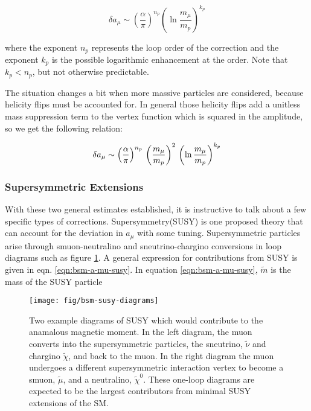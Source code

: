 \begin{equation}
\label{eqn:bsm-general-small-m}
\delta a_\mu \sim \left(\frac{\alpha}{\pi}\right)^{n_p} \left( \ln{\frac{m_\mu}{m_p}} \right)^{k_p}
\end{equation}

\noindent
where the exponent $n_p$ represents the loop order of the correction and the exponent $k_p$ is the possible logarithmic enhancement at the order.  Note that $k_p < n_p$, but not otherwise predictable.

The situation changes a bit when more massive particles are considered, because helicity flips must be accounted for.  In general those helicity flips add a unitless mass suppression term to the vertex function which is squared in the amplitude, so we get the following relation:

\begin{equation}
\label{eqn:bsm-general-large-m}
\delta a_\mu \sim \left(\frac{\alpha}{\pi}\right)^{n_p} \\
\left(\frac{m_\mu}{m_p}\right)^2 \\
\left(\ln{\frac{m_\mu}{m_p}} \right)^{k_p}
\end{equation}

\subsubsection{Supersymmetric Extensions}
With these two general estimates established, it is instructive to talk about a few specific types of corrections.  Supersymmetry(SUSY) is one proposed theory that can account for the deviation in $a_\mu$ with some tuning.  Supersymmetric particles arise through smuon-neutralino and sneutrino-chargino conversions in loop diagrams such as figure \ref{fig:bsm-susy-diagrams}.  A general expression for contributions from SUSY is given in eqn. \ref{eqn:bsm-a-mu-susy}\cite{a-mu-harbinger}.  In equation \ref{eqn:bsm-a-mu-susy}, $\tilde{m}$ is the mass of the SUSY particle

\begin{figure}
\label{fig:bsm-susy-diagrams}
\centering
\texttt{[image: fig/bsm-susy-diagrams]}
\caption{Two example diagrams of SUSY which would contribute to the anamalous magnetic moment. In the left diagram, the muon converts into the supersymmetric particles, the sneutrino, $\tilde{\nu}$ and chargino $\tilde{\chi}$, and back to the muon.  In the right diagram the muon undergoes a different supersymmetric interaction vertex to become a smuon, $\tilde{\mu}$, and a neutralino, $\tilde{\chi}^0$.  These one-loop diagrams are expected to be the largest contributors from minimal SUSY extensions of the SM.}
\end{figure}

